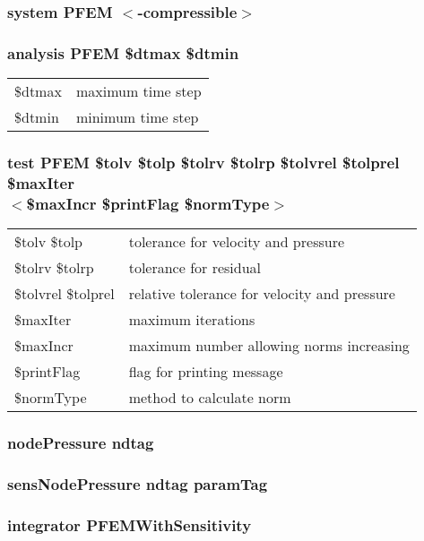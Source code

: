 \documentclass[12pt]{article}
\begin{document}
\subsubsection*{system PFEM $<$-compressible$>$}


\subsubsection*{analysis PFEM \$dtmax \$dtmin}
\begin{tabular}{ll}
\$dtmax & maximum time step\\
\$dtmin & minimum time step
\end{tabular}


\subsubsection*{test PFEM \$tolv \$tolp \$tolrv \$tolrp \$tolvrel \$tolprel \$maxIter\\ 
$<$\$maxIncr \$printFlag \$normType$>$}
\begin{tabular}{ll}
\$tolv \$tolp & tolerance for velocity and pressure\\
\$tolrv \$tolrp & tolerance for residual\\
\$tolvrel \$tolprel & relative tolerance for velocity and pressure\\
\$maxIter & maximum iterations\\
\$maxIncr & maximum number allowing norms increasing\\
\$printFlag & flag for printing message\\
\$normType & method to calculate norm
\end{tabular}

\subsubsection*{nodePressure ndtag}

\subsubsection*{sensNodePressure ndtag paramTag}

\subsubsection*{integrator PFEMWithSensitivity}
\end{document}
